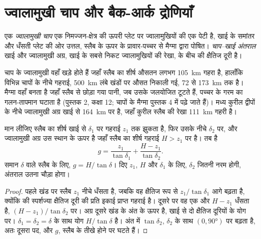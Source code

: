 \section{ज्वालामुखी चाप और बैक-आर्क द्रोणियाँ}\label{sec:b1:active-margins:arcs}

\begin{definition}[ज्वालामुखी चाप, चाप–खाई अंतराल]\label{def:b1:active-margins:volcanic-arc}
एक \emph{ज्वालामुखी चाप} एक निमज्जन-क्षेत्र की ऊपरी प्लेट पर ज्वालामुखियों की एक पेटी है, खाई के समांतर और धँसती प्लेट की ओर उत्तल, स्लैब के ऊपर के प्रावार-पच्चर से मैग्मा द्वारा पोषित। \emph{चाप–खाई अंतराल} खाई और ज्वालामुखी अग्र, खाई के सबसे निकट ज्वालामुखियों की रेखा, के बीच की क्षैतिज दूरी है।
\end{definition}

चाप के ज्वालामुखी वहाँ खड़े होते हैं जहाँ स्लैब का शीर्ष औसतन लगभग \qty{105}{km} गहरा है, हालाँकि विभिन्न चापों के नीचे गहराई, \qty{500}{km} लंबे खंडों पर औसत निकाली गई, 72 से \qty{173}{km} तक है। मैग्मा वहाँ बनता है जहाँ स्लैब से छोड़ा गया पानी, जब उसके जलयोजित  टूटते हैं, पच्चर के गरम  का गलन-तापमान घटाता है (पुस्तक 2, कक्षा 12; चापों के मैग्मा पुस्तक 4 में पढ़े जाते हैं)। मध्य कुरील द्वीपों के नीचे ज्वालामुखी अग्र खाई से \qty{164}{km} पर है, जहाँ कुरील स्लैब की रेखा \qty{111}{km} गहरी है।

\begin{proposition}[चाप–खाई अंतराल]\label{prop:b1:active-margins:gap}
मान लीजिए स्लैब का शीर्ष खाई से $\delta_1$ पर गहराई $z_1$ तक झुकता है, फिर उसके नीचे $\delta_2$ पर, और ज्वालामुखी अग्र उस स्थान के ऊपर है जहाँ स्लैब का शीर्ष गहराई $H > z_1$ पर है। तब  है
\[
  g = \frac{z_1}{\tan\delta_1} + \frac{H - z_1}{\tan\delta_2} .
\]
समान  $\delta$ वाले स्लैब के लिए, $g = H/\tan\delta$। दिए $z_1$, $H$ और $\delta_1$ के लिए,  $\delta_2$ जितनी नरम होगी, अंतराल उतना चौड़ा होगा।
\end{proposition}

\begin{proof}
पहले खंड पर स्लैब $z_1$ नीचे धँसता है, जबकि वह क्षैतिज रूप से $z_1/\tan\delta_1$ आगे बढ़ता है, क्योंकि  की स्पर्शज्या क्षैतिज दूरी की प्रति इकाई प्राप्त गहराई है। दूसरे पर वह एक और $H - z_1$ धँसता है, $(H - z_1)/\tan\delta_2$ पर। अग्र दूसरे खंड के अंत के ऊपर है, खाई से दो क्षैतिज दूरियों के योग पर। $\delta_1 = \delta_2
= \delta$ के साथ योग $H/\tan\delta$ है। अंत में $\tan\delta_2$, $\delta_2$ के साथ $(0, \ang{90})$ पर बढ़ता है, अतः दूसरा पद, और $g$, स्लैब के तीखे होने पर घटते हैं।
\end{proof}

